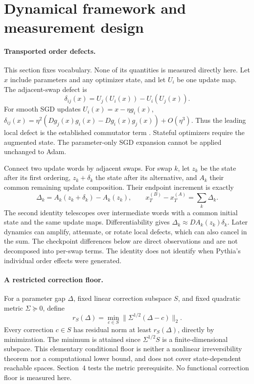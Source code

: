 \documentclass{article}
\begin{document}
\section{Dynamical framework and measurement design}
\paragraph{Transported order defects.}
This section fixes vocabulary. None of its quantities is measured directly here. Let $x$ include parameters and any optimizer state, and let $U_i$ be one update map. The adjacent-swap defect is
\begin{equation}
 \delta_{ij}(x)=U_j(U_i(x))-U_i(U_j(x)).
\end{equation}
For smooth SGD updates $U_i(x)=x-\eta g_i(x)$,
$\delta_{ij}(x)=\eta^2(Dg_j(x)g_i(x)-Dg_i(x)g_j(x))+O(\eta^3)$.
Thus the leading local defect is the established commutator term \citep{rukhovich,sweeney}. Stateful optimizers require the augmented state. The parameter-only SGD expansion cannot be applied unchanged to Adam.

Connect two update words by adjacent swaps. For swap $k$, let $z_k$ be the state after its first ordering, $z_k+\delta_k$ the state after its alternative, and $A_k$ their common remaining update composition. Their endpoint increment is exactly
\begin{equation}
 \Delta_k=A_k(z_k+\delta_k)-A_k(z_k),\qquad
 x_T^{(B)}-x_T^{(A)}=\sum_k\Delta_k.
\end{equation}
The second identity telescopes over intermediate words with a common initial state and the same update maps. Differentiability gives $\Delta_k\approx DA_k(z_k)\delta_k$. Later dynamics can amplify, attenuate, or rotate local defects, which can also cancel in the sum. The checkpoint differences below are direct observations and are not decomposed into per-swap terms. The identity does not identify when Pythia's individual order effects were generated.

\paragraph{A restricted correction floor.}
For a parameter gap $\Delta$, fixed linear correction subspace $S$, and fixed quadratic metric $\Sigma\succeq0$, define
\begin{equation}
 r_S(\Delta)=\min_{c\in S}\|\Sigma^{1/2}(\Delta-c)\|_2.
 \label{eq:floor}
\end{equation}
Every correction $c\in S$ has residual norm at least $r_S(\Delta)$, directly by minimization. The minimum is attained since $\Sigma^{1/2}S$ is a finite-dimensional subspace. This elementary conditional floor is neither a nonlinear irreversibility theorem nor a computational lower bound, and does not cover state-dependent reachable spaces. Section~4 tests the metric prerequisite. No functional correction floor is measured here.
\end{document}
